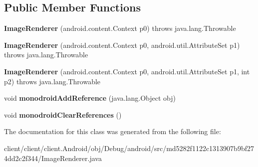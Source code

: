 \subsection*{Public Member Functions}
\begin{DoxyCompactItemize}
\item 
\hypertarget{classmd5282f1122c1313907b9bf274dd2c2f344_1_1ImageRenderer_a26271759df3afdf265091a35d21aa762}{}{\bfseries Image\+Renderer} (android.\+content.\+Context p0)  throws java.\+lang.\+Throwable 	\label{classmd5282f1122c1313907b9bf274dd2c2f344_1_1ImageRenderer_a26271759df3afdf265091a35d21aa762}

\item 
\hypertarget{classmd5282f1122c1313907b9bf274dd2c2f344_1_1ImageRenderer_ae002cb3677c12d31028862b2ec8d84a3}{}{\bfseries Image\+Renderer} (android.\+content.\+Context p0, android.\+util.\+Attribute\+Set p1)  throws java.\+lang.\+Throwable 	\label{classmd5282f1122c1313907b9bf274dd2c2f344_1_1ImageRenderer_ae002cb3677c12d31028862b2ec8d84a3}

\item 
\hypertarget{classmd5282f1122c1313907b9bf274dd2c2f344_1_1ImageRenderer_a8bef7d61359e449970bc46025eff4111}{}{\bfseries Image\+Renderer} (android.\+content.\+Context p0, android.\+util.\+Attribute\+Set p1, int p2)  throws java.\+lang.\+Throwable 	\label{classmd5282f1122c1313907b9bf274dd2c2f344_1_1ImageRenderer_a8bef7d61359e449970bc46025eff4111}

\item 
\hypertarget{classmd5282f1122c1313907b9bf274dd2c2f344_1_1ImageRenderer_a88691bab4728d8148105ee35a57af461}{}void {\bfseries monodroid\+Add\+Reference} (java.\+lang.\+Object obj)\label{classmd5282f1122c1313907b9bf274dd2c2f344_1_1ImageRenderer_a88691bab4728d8148105ee35a57af461}

\item 
\hypertarget{classmd5282f1122c1313907b9bf274dd2c2f344_1_1ImageRenderer_a37bc57d96dc95da3f1dbf779ccadc642}{}void {\bfseries monodroid\+Clear\+References} ()\label{classmd5282f1122c1313907b9bf274dd2c2f344_1_1ImageRenderer_a37bc57d96dc95da3f1dbf779ccadc642}

\end{DoxyCompactItemize}


The documentation for this class was generated from the following file\+:\begin{DoxyCompactItemize}
\item 
client/client/client.\+Android/obj/\+Debug/android/src/md5282f1122c1313907b9bf274dd2c2f344/Image\+Renderer.\+java\end{DoxyCompactItemize}
